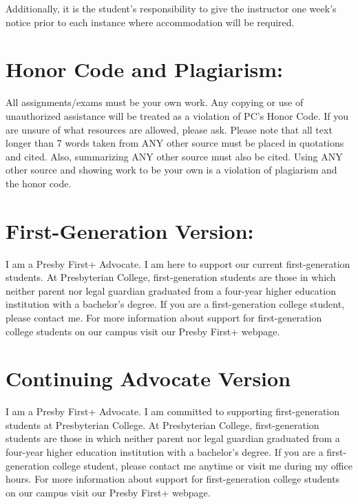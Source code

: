 \documentclass[
]{book}
\begin{document}
Additionally, it is the student's responsibility to give the instructor one week's notice prior to each instance where accommodation will be required.

\hypertarget{honor-code-and-plagiarism}{%
\section{Honor Code and Plagiarism:}\label{honor-code-and-plagiarism}}

All assignments/exams must be your own work. Any copying or use of unauthorized assistance will be treated as a violation of PC's Honor Code. If you are unsure of what resources are allowed, please ask. Please note that all text longer than 7 words taken from ANY other source must be placed in quotations and cited. Also, summarizing ANY other source must also be cited. Using ANY other source and showing work to be your own is a violation of plagiarism and the honor code.

\hypertarget{first-generation-version}{%
\section{First-Generation Version:}\label{first-generation-version}}

I am a Presby First+ Advocate. I am here to support our current first-generation students. At Presbyterian College, first-generation students are those in which neither parent nor legal guardian graduated from a four-year higher education institution with a bachelor's degree. If you are a first-generation college student, please contact me. For more information about support for first-generation college students on our campus visit our Presby First+ webpage.

\hypertarget{continuing-advocate-version}{%
\section{Continuing Advocate Version}\label{continuing-advocate-version}}

I am a Presby First+ Advocate. I am committed to supporting first-generation students at Presbyterian College. At Presbyterian College, first-generation students are those in which neither parent nor legal guardian graduated from a four-year higher education institution with a bachelor's degree. If you are a first-generation college student, please contact me anytime or visit me during my office hours. For more information about support for first-generation college students on our campus visit our Presby First+ webpage.
\end{document}
